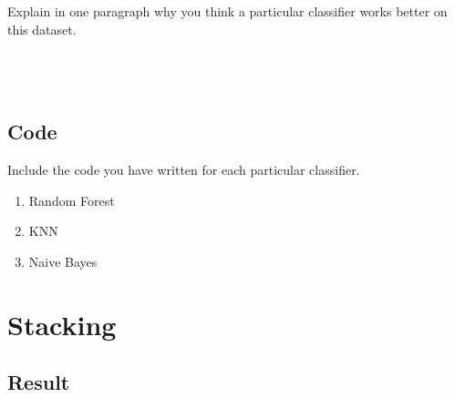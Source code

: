 Explain in one paragraph why you think a particular classifier works better on this dataset.\\~\\~\\~\\

\subsection{Code}
Include the code you have written for each particular classifier.
\begin{enumerate}
\item Random Forest\\
\item KNN\\
\item Naive Bayes\\
\end{enumerate}

\section{Stacking}




\subsection{Result}

